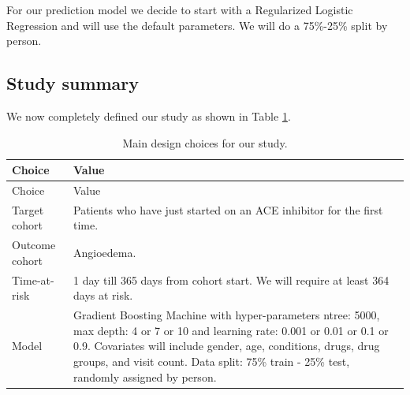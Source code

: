 \documentclass[]{book}
\begin{document}
For our prediction model we decide to start with a Regularized Logistic
Regression and will use the default parameters. We will do a 75\%-25\%
split by person.

\subsection{Study summary}\label{study-summary-1}

We now completely defined our study as shown in Table
\ref{tab:plpSummary}.

\begin{longtable}[]{@{}ll@{}}
\caption{\label{tab:plpSummary} Main design choices for our
study.}\tabularnewline
\toprule
\begin{minipage}[b]{0.23\columnwidth}\raggedright\strut
Choice\strut
\end{minipage} & \begin{minipage}[b]{0.71\columnwidth}\raggedright\strut
Value\strut
\end{minipage}\tabularnewline
\midrule
\endfirsthead
\toprule
\begin{minipage}[b]{0.23\columnwidth}\raggedright\strut
Choice\strut
\end{minipage} & \begin{minipage}[b]{0.71\columnwidth}\raggedright\strut
Value\strut
\end{minipage}\tabularnewline
\midrule
\endhead
\begin{minipage}[t]{0.23\columnwidth}\raggedright\strut
Target cohort\strut
\end{minipage} & \begin{minipage}[t]{0.71\columnwidth}\raggedright\strut
Patients who have just started on an ACE inhibitor for the first
time.\strut
\end{minipage}\tabularnewline
\begin{minipage}[t]{0.23\columnwidth}\raggedright\strut
Outcome cohort\strut
\end{minipage} & \begin{minipage}[t]{0.71\columnwidth}\raggedright\strut
Angioedema.\strut
\end{minipage}\tabularnewline
\begin{minipage}[t]{0.23\columnwidth}\raggedright\strut
Time-at-risk\strut
\end{minipage} & \begin{minipage}[t]{0.71\columnwidth}\raggedright\strut
1 day till 365 days from cohort start. We will require at least 364 days
at risk.\strut
\end{minipage}\tabularnewline
\begin{minipage}[t]{0.23\columnwidth}\raggedright\strut
Model\strut
\end{minipage} & \begin{minipage}[t]{0.71\columnwidth}\raggedright\strut
Gradient Boosting Machine with hyper-parameters ntree: 5000, max depth:
4 or 7 or 10 and learning rate: 0.001 or 0.01 or 0.1 or 0.9. Covariates
will include gender, age, conditions, drugs, drug groups, and visit
count. Data split: 75\% train - 25\% test, randomly assigned by
person.\strut
\end{minipage}\tabularnewline
\bottomrule
\end{longtable}
\end{document}
